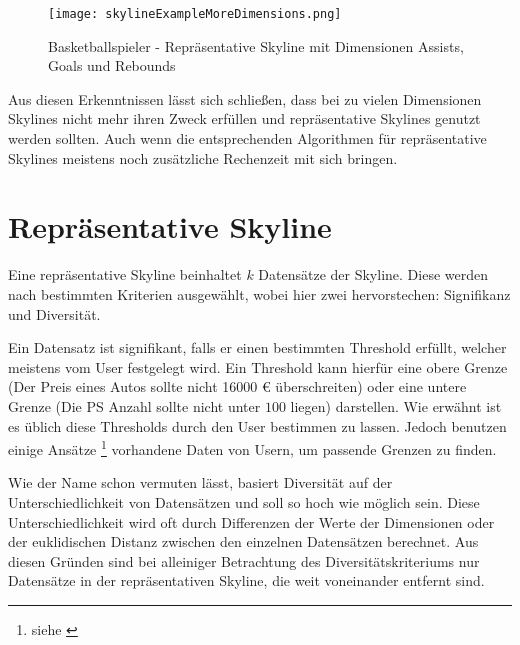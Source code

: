 \begin{figure}[H]
	\centering
    \texttt{[image: skylineExampleMoreDimensions.png]}
	\caption{Basketballspieler - Repräsentative Skyline mit Dimensionen Assists, Goals und Rebounds}
	\label{img:skylineExampleMoreDimensions}
\end{figure}

Aus diesen Erkenntnissen lässt sich schließen, dass bei zu vielen Dimensionen Skylines nicht mehr ihren Zweck erfüllen und repräsentative Skylines genutzt werden sollten. Auch wenn die entsprechenden Algorithmen für repräsentative Skylines meistens noch zusätzliche Rechenzeit mit sich bringen.
\section{Repräsentative Skyline}
\label{ch:Grundlagen:sec:repSkyline}
Eine repräsentative Skyline beinhaltet $k$ Datensätze der Skyline. Diese werden nach bestimmten Kriterien ausgewählt, wobei hier zwei hervorstechen: Signifikanz und Diversität.

Ein Datensatz ist signifikant, falls er einen bestimmten Threshold erfüllt, welcher meistens vom User festgelegt wird. Ein Threshold kann hierfür eine obere Grenze (Der Preis eines Autos sollte nicht 16000 \euro{} überschreiten) oder eine untere Grenze (Die PS Anzahl sollte nicht unter $100$ liegen) darstellen. 
Wie erwähnt ist es üblich diese Thresholds durch den User bestimmen zu lassen. Jedoch benutzen einige Ansätze \footnote{siehe \cite{36988}} vorhandene Daten von Usern, um passende Grenzen zu finden.

Wie der Name schon vermuten lässt, basiert Diversität auf der Unterschiedlichkeit von Datensätzen und soll so hoch wie möglich sein. Diese Unterschiedlichkeit wird oft durch Differenzen der Werte der Dimensionen oder der euklidischen Distanz zwischen den einzelnen Datensätzen berechnet. 
Aus diesen Gründen sind bei alleiniger Betrachtung des Diversitätskriteriums nur Datensätze in der repräsentativen Skyline, die weit voneinander entfernt sind. 

